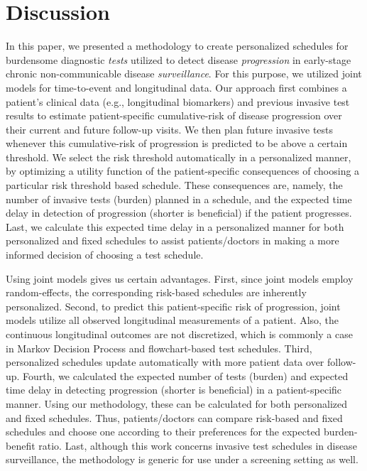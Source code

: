 \documentclass[useAMS, usenatbib, referee]{biom}
\begin{document}
\section{Discussion}
\label{sec:discussion}
In this paper, we presented a methodology to create personalized schedules for burdensome diagnostic \textit{tests} utilized to detect disease \textit{progression} in early-stage chronic non-communicable disease \textit{surveillance}. For this purpose, we utilized joint models for time-to-event and longitudinal data. Our approach first combines a patient's clinical data (e.g., longitudinal biomarkers) and previous invasive test results to estimate patient-specific cumulative-risk of disease progression over their current and future follow-up visits. We then plan future invasive tests whenever this cumulative-risk of progression is predicted to be above a certain threshold. We select the risk threshold automatically in a personalized manner, by optimizing a utility function of the patient-specific consequences of choosing a particular risk threshold based schedule. These consequences are, namely, the number of invasive tests (burden) planned in a schedule, and the expected time delay in detection of progression (shorter is beneficial) if the patient progresses. Last, we calculate this expected time delay in a personalized manner for both personalized and fixed schedules to assist patients/doctors in making a more informed decision of choosing a test schedule.

Using joint models gives us certain advantages. First, since joint models employ random-effects, the corresponding risk-based schedules are inherently personalized. Second, to predict this patient-specific risk of progression, joint models utilize all observed longitudinal measurements of a patient. Also, the continuous longitudinal outcomes are not discretized, which is commonly a case in Markov Decision Process and flowchart-based test schedules. Third, personalized schedules update automatically with more patient data over follow-up. Fourth, we calculated the expected number of tests (burden) and expected time delay in detecting progression (shorter is beneficial) in a patient-specific manner. Using our methodology, these can be calculated for both personalized and fixed schedules. Thus, patients/doctors can compare risk-based and fixed schedules and choose one according to their preferences for the expected burden-benefit ratio. Last, although this work concerns invasive test schedules in disease surveillance, the methodology is generic for use under a screening setting as well.
\end{document}
